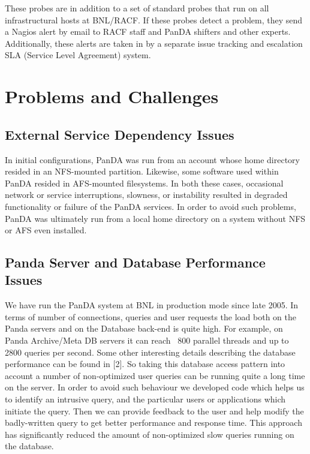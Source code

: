 \documentclass[letterpaper]{jpconf}
\begin{document}
These probes are in addition to a set of standard probes that run on all
infrastructural hosts at BNL/RACF. If these probes detect a problem, they send 
a Nagios alert by email to RACF staff and PanDA shifters and other experts. 
Additionally, these alerts are taken in by a separate issue tracking 
and escalation  SLA (Service Level Agreement) system.  

\section{Problems and Challenges} 

\subsection{External Service Dependency Issues}

In initial configurations, PanDA was run from an account whose home directory resided in an 
NFS-mounted partition. Likewise, some software used within PanDA resided in AFS-mounted filesystems. 
In both these cases, occasional network or service interruptions, slowness, or instability resulted 
in degraded functionality or failure of the PanDA services. In order to avoid such problems, PanDA 
was ultimately run from a local home directory on a system without NFS or AFS even installed.

\subsection{Panda Server and Database Performance Issues}

We have run the PanDA system at BNL in production mode since late 2005. In terms
of number of connections, queries and user requests the load both on the Panda servers and on 
the Database back-end is quite high. For example, on Panda Archive/Meta DB
servers it can reach ~800 parallel threads and up to 2800 queries per second. Some other 
interesting details describing the database performance can be found in [2]. So 
taking this database access pattern into account a number of non-optimized user 
queries can be running quite a long time on the server. In order to avoid such  
behaviour we developed code which helps us to identify an intrusive query,
and the particular users or applications which initiate the query. Then we can
provide feedback to the user and help modify the badly-written query to get 
better performance and response time. This approach has significantly reduced
the amount of non-optimized slow queries running on the database.
\end{document}
